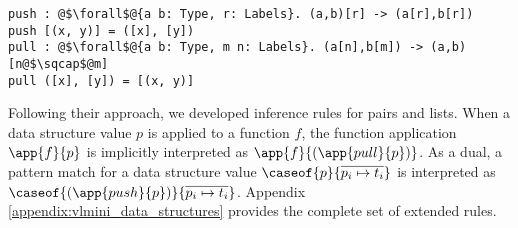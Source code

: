 \begin{center}
\begin{verbatim}
push : @$\forall$@{a b: Type, r: Labels}. (a,b)[r] -> (a[r],b[r])
push [(x, y)] = ([x], [y])
pull : @$\forall$@{a b: Type, m n: Labels}. (a[n],b[m]) -> (a,b)[n@$\sqcap$@m]
pull ([x], [y]) = [(x, y)]
\end{verbatim}
\end{center}

Following their approach, we developed inference rules for pairs and lists.
When a data structure value $p$ is applied to a function $f$, the function application $\app{f}{p}$ is implicitly interpreted as $\app{f}{(\app{pull}{p})}$. As a dual, a pattern match for a data structure value $\caseof{p}{\overline{p_i \mapsto t_i}}$ is interpreted as $\caseof{(\app{push}{p})}{\overline{p_i \mapsto t_i}}$.
Appendix \ref{appendix:vlmini_data_structures} provides the complete set of extended rules.
